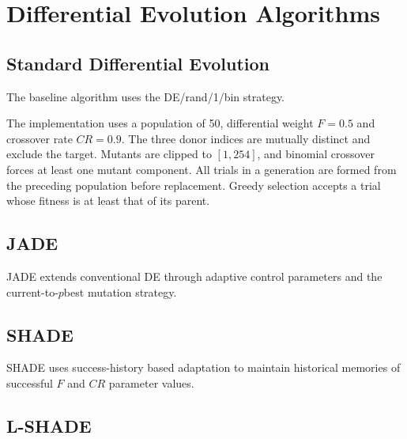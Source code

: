 \documentclass[review]{elsarticle}
\begin{document}
\section{Differential Evolution Algorithms}
\label{sec:algorithms}


\subsection{Standard Differential Evolution}

The baseline algorithm uses the DE/rand/1/bin strategy.

The implementation uses a population of 50, differential weight $F=0.5$
and crossover rate $CR=0.9$. The three donor indices are mutually distinct
and exclude the target. Mutants are clipped to $[1,254]$, and binomial
crossover forces at least one mutant component. All trials in a generation
are formed from the preceding population before replacement. Greedy
selection accepts a trial whose fitness is at least that of its parent.



\subsection{JADE}

JADE extends conventional DE through adaptive control parameters and
the current-to-$p$best mutation strategy.



\subsection{SHADE}

SHADE uses success-history based adaptation to maintain historical
memories of successful $F$ and $CR$ parameter values.



\subsection{L-SHADE}
\end{document}

